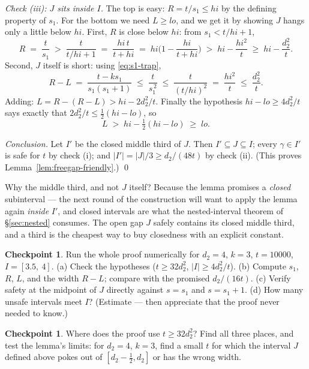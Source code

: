 \documentclass[11pt,reqno]{amsart}
\theoremstyle{plain}
\theoremstyle{definition}
\newtheorem{checkpoint}[theorem]{Checkpoint}   %
\theoremstyle{remark}
\begin{document}
\medskip
\emph{Check (iii): $J$ sits inside $I$.} The top is easy: $R = t/s_1 \le hi$ by the
defining property of $s_1$. For the bottom we need $L \ge lo$, and we get it by
showing $J$ hangs only a little below $hi$. First, $R$ is close below $hi$: from
$s_1 < t/hi + 1$,
\[
  R \;=\; \frac{t}{s_1} \;>\; \frac{t}{t/hi + 1} \;=\; \frac{hi\,t}{t + hi}
     \;=\; hi\Big(1 - \frac{hi}{t + hi}\Big) \;>\; hi - \frac{hi^2}{t}
     \;\ge\; hi - \frac{d_2^2}{t} .
\]
Second, $J$ itself is short: using \eqref{eq:s1-trap},
\[
  R - L \;=\; \frac{t - k s_1}{s_1(s_1+1)} \;\le\; \frac{t}{s_1^{\,2}}
        \;\le\; \frac{t}{(t/hi)^2} \;=\; \frac{hi^2}{t} \;\le\; \frac{d_2^2}{t} .
\]
Adding: $L = R - (R - L) > hi - 2 d_2^2/t$. Finally the hypothesis
$hi - lo \ge 4d_2^2/t$ says exactly that $2 d_2^2 / t \le \tfrac12 (hi - lo)$, so
\[
  L \;>\; hi - \tfrac12(hi - lo) \;\ge\; lo .
\]

\medskip
\emph{Conclusion.} Let $I'$ be the closed middle third of $J$. Then $I' \subseteq J
\subseteq I$; every $\gamma \in I'$ is safe for $t$ by check (i); and $|I'| = |J|/3
\ge d_2/(48t)$ by check (ii). \hfill (This proves Lemma~\ref{lem:freegap-friendly}.)
\qed

\medskip
Why the middle third, and not $J$ itself? Because the lemma promises a \emph{closed}
subinterval --- the next round of the construction will want to apply the lemma again
\emph{inside} $I'$, and closed intervals are what the nested-interval theorem of
\S\ref{sec:nested} consumes. The open gap $J$ safely contains its closed middle
third, and a third is the cheapest way to buy closedness with an explicit constant.

\begin{checkpoint}\label{chk:freegap-concrete}
Run the whole proof numerically for $d_2 = 4$, $k = 3$, $t = 10000$,
$I = [3.5,\ 4]$. (a) Check the hypotheses ($t \ge 32d_2^2$, $|I| \ge 4d_2^2/t$).
(b) Compute $s_1$, $R$, $L$, and the width $R - L$; compare with the promised
$d_2/(16t)$. (c) Verify safety at the midpoint of $J$ directly against
$s = s_1$ and $s = s_1 + 1$. (d) How many unsafe intervals meet $I$? (Estimate ---
then appreciate that the proof never needed to know.)
\end{checkpoint}

\begin{checkpoint}
Where does the proof use $t \ge 32 d_2^2$? Find all three places, and test the lemma's
limits: for $d_2 = 4$, $k = 3$, find a small $t$ for which the interval $J$ defined
above pokes out of $[d_2 - \tfrac12, d_2]$ or has the wrong width.
\end{checkpoint}
\end{document}

